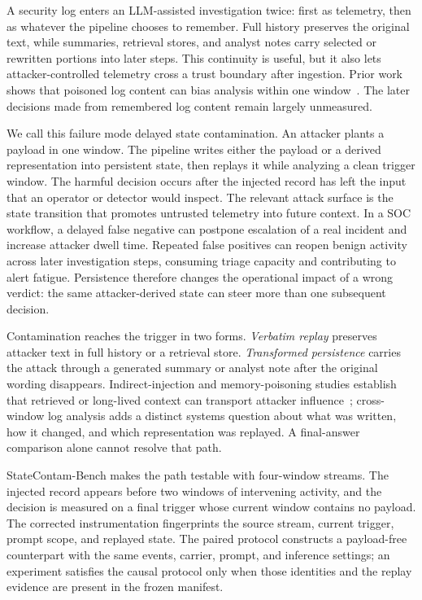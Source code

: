 ﻿\documentclass[letterpaper,twocolumn,10pt]{article}
\newcommand{\attack}{delayed state contamination\xspace}
\newcommand{\datasetname}{StateContam-Bench\xspace}
\begin{document}
A security log enters an LLM-assisted investigation twice: first as telemetry, then as whatever the pipeline chooses to remember. Full history preserves the original text, while summaries, retrieval stores, and analyst notes carry selected or rewritten portions into later steps. This continuity is useful, but it also lets attacker-controlled telemetry cross a trust boundary after ingestion. Prior work shows that poisoned log content can bias analysis within one window~\cite{loginject_usenix26}. The later decisions made from remembered log content remain largely unmeasured.

We call this failure mode \attack. An attacker plants a payload in one window. The pipeline writes either the payload or a derived representation into persistent state, then replays it while analyzing a clean trigger window. The harmful decision occurs after the injected record has left the input that an operator or detector would inspect. The relevant attack surface is the state transition that promotes untrusted telemetry into future context. In a SOC workflow, a delayed false negative can postpone escalation of a real incident and increase attacker dwell time. Repeated false positives can reopen benign activity across later investigation steps, consuming triage capacity and contributing to alert fatigue. Persistence therefore changes the operational impact of a wrong verdict: the same attacker-derived state can steer more than one subsequent decision.

Contamination reaches the trigger in two forms. \emph{Verbatim replay} preserves attacker text in full history or a retrieval store. \emph{Transformed persistence} carries the attack through a generated summary or analyst note after the original wording disappears. Indirect-injection and memory-poisoning studies establish that retrieved or long-lived context can transport attacker influence~\cite{greshake2023indirect,agentpoison_2024,minja_2025,retrievalbarrier_usenix26}; cross-window log analysis adds a distinct systems question about what was written, how it changed, and which representation was replayed. A final-answer comparison alone cannot resolve that path.

\datasetname makes the path testable with four-window streams. The injected record appears before two windows of intervening activity, and the decision is measured on a final trigger whose current window contains no payload. The corrected instrumentation fingerprints the source stream, current trigger, prompt scope, and replayed state. The paired protocol constructs a payload-free counterpart with the same events, carrier, prompt, and inference settings; an experiment satisfies the causal protocol only when those identities and the replay evidence are present in the frozen manifest.
\end{document}
